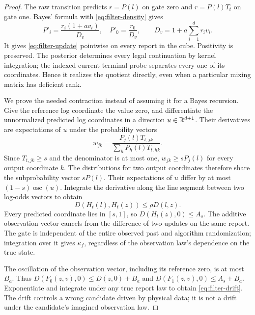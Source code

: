 \begin{proof}
The raw transition predicts $r=P(l)$ on gate zero and $r=P(l)T_t$ on gate one. Bayes' formula with \eqref{eq:filter-density} gives
\begin{equation}\label{eq:filter-bayes}
 P'_{i}=\frac{r_i(1+av_i)}{D_v},\quad
 P'_0=\frac{r_0}{D_v},\qquad
 D_v=1+a\sum_{i=1}^d r_i v_i.
\end{equation}
It gives \eqref{eq:filter-update} pointwise on every report in the cube. Positivity is preserved. The posterior determines every legal continuation by kernel integration; the indexed current terminal probe separates every one of its coordinates. Hence it realizes the quotient directly, even when a particular mixing matrix has deficient rank.

We prove the needed contraction instead of assuming it for a Bayes recursion. Give the reference log coordinate the value zero, and differentiate the unnormalized predicted log coordinates in a direction $u\in\mathbb R^{d+1}$. Their derivatives are expectations of $u$ under the probability vectors
\[
 w_{jk}=\frac{P_j(l)T_{t,jk}}{\sum_hP_h(l)T_{t,hk}}.
\]
Since $T_{t,jk}\ge s$ and the denominator is at most one, $w_{jk}\ge sP_j(l)$ for every output coordinate $k$. The distributions for two output coordinates therefore share the subprobability vector $sP(l)$. Their expectations of $u$ differ by at most $(1-s)\operatorname{osc}(u)$. Integrate the derivative along the line segment between two log-odds vectors to obtain
\[
 D(H_t(l),H_t(z))\le\rho D(l,z).
\]
Every predicted coordinate lies in $[s,1]$, so $D(H_t(z),0)\le A_s$. The additive observation vector cancels from the difference of two updates on the same report. The gate is independent of the entire observed past and algorithm randomization; integration over it gives $\kappa_f$, regardless of the observation law's dependence on the true state.

The oscillation of the observation vector, including its reference zero, is at most $B_a$. Thus $D(F_0(z,v),0)\le D(z,0)+B_a$ and $D(F_1(z,v),0)\le A_s+B_a$. Exponentiate and integrate under any true report law to obtain \eqref{eq:filter-drift}. The drift controls a wrong candidate driven by physical data; it is not a drift under the candidate's imagined observation law.
\end{proof}

